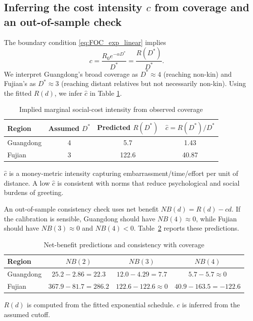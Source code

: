 \documentclass[AER]{AEA}
\begin{document}
\subsection{Inferring the cost intensity $c$ from coverage and an out-of-sample check}
The boundary condition \eqref{eq:FOC_exp_linear} implies
\[
c=\frac{R_0 e^{-\alpha D^*}}{D^*}=\frac{R(D^*)}{D^*}.
\]
We interpret Guangdong's broad coverage as $D^*\approx 4$ (reaching non-kin) and Fujian's as $D^*\approx 3$ (reaching distant relatives but not necessarily non-kin). Using the fitted $R(d)$, we infer $\widehat{c}$ in Table \ref{tab:cali}.

\begin{table}[ht]
\centering
\caption{Implied marginal social-cost intensity from observed coverage}
\label{tab:cali}
\begin{tabular}{lccc}
\toprule
Region & Assumed $D^*$ & Predicted $R(D^*)$ & $\widehat{c}=R(D^*)/D^*$ \\
\midrule
Guangdong & 4 & 5.7 & 1.43 \\
Fujian    & 3 & 122.6 & 40.87 \\
\bottomrule
\end{tabular}
\begin{tablenotes}
$\widehat{c}$ is a money-metric intensity capturing embarrassment/time/effort per unit of distance. A low $\widehat{c}$ is consistent with norms that reduce psychological and social burdens of greeting.
\end{tablenotes}
\end{table}

An out-of-sample consistency check uses net benefit $NB(d)=R(d)-cd$. If the calibration is sensible, Guangdong should have $NB(4)\approx 0$, while Fujian should have $NB(3)\approx 0$ and $NB(4)<0$. Table~\ref{tab:nb} reports these predictions.

\begin{table}[ht]
\centering
\caption{Net-benefit predictions and consistency with coverage}
\label{tab:nb}
\begin{tabular}{lccc}
\toprule
Region & $NB(2)$ & $NB(3)$ & $NB(4)$ \\
\midrule
Guangdong & $25.2-2.86=22.3$ & $12.0-4.29=7.7$ & $5.7-5.7\approx 0$ \\
Fujian    & $367.9-81.7=286.2$ & $122.6-122.6\approx 0$ & $40.9-163.5=-122.6$ \\
\bottomrule
\end{tabular}
\begin{tablenotes}
$R(d)$ is computed from the fitted exponential schedule. $c$ is inferred from the assumed cutoff.
\end{tablenotes}
\end{table}
\end{document}
